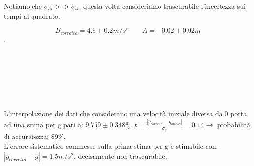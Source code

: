\documentclass[a4paper]{article}
\theoremstyle{definition}
\begin{document}
\noindent Notiamo che \(\sigma_{hi} >> \sigma_{ti}\), questa volta consideriamo trascurabile l'incertezza sui tempi al quadrato.

\[B_{corretto}=4.9 \pm 0.2 m/s^{s} \qquad A=-0.02  \pm 0.02 m\]
.\\\\\\\\\\\\\\
\begin{figure}[!ht]
	\captionsetup{labelformat=empty}
\end{figure}

\noindent L'interpolazione dei dati che considerano una velocità iniziale diversa da 0 porta ad una stima per g pari a: \(9.759\pm 0.348 \frac{m}{s^{2}}\).  \( t= \frac{\left | g_{corretta} - g_{attesa} \right |}{\sigma_{g}} = 0.14\rightarrow\)  probabilità di  accuratezza: 89\(\%\). \\
\noindent L'errore sistematico commesso sulla prima stima per g è stimabile con: \(\left | g_{corretta} - g\right |=1.5 m/s^{2}\), decisamente non trascurabile.
\end{document}
